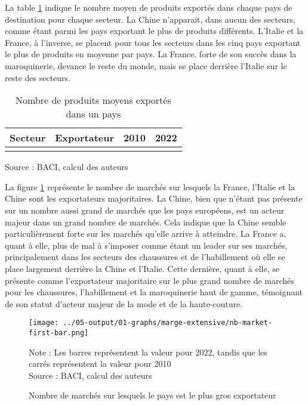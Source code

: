 \documentclass[french,10pt,a4paper]{article}
\begin{document}
La table \ref{tab:table-nb-mean-product-export} indique le nombre moyen de produits exportés dans chaque pays de destination pour chaque secteur. La Chine n'apparait, dans aucun des secteurs, comme étant parmi les pays exportant le plus de produits différents. L'Italie et la France, à l'inverse, se placent pour tous les secteurs dans les cinq pays exportant le plus de produits en moyenne par pays. La France, forte de son succès dans la maroquinerie, devance le reste du monde, mais se place derrière l'Italie sur le reste des secteurs.

\begin{table}[ht]
  \centering
  \begin{tabular}{lrrr}
    \hline
   Secteur & Exportateur & 2010 & 2022 \\
    \hline
    \\
    \hline
  \end{tabular}
  \captionsetup{justification=raggedright,singlelinecheck=false, font=small}
  \caption*{Source : BACI, calcul des auteurs}
  \captionsetup{justification=centering, singlelinecheck=true, font=normalsize}
  \caption{Nombre de produits moyens exportés dans un pays}
  \label{tab:table-nb-mean-product-export}
\end{table}

La figure \ref{fig:nb-market-first-bar} représente le nombre de marchés sur lesquels la France, l'Italie et la Chine sont les exportateurs majoritaires. La Chine, bien que n'étant pas présente sur un nombre aussi grand de marchés que les pays européens, est un acteur majeur dans un grand nombre de marchés. Cela indique que la Chine semble particulièrement forte sur les marchés qu'elle arrive à atteindre. La France a, quant à elle, plus de mal à s'imposer comme étant un leader sur ses marchés, principalement dans les secteurs des chaussures et de l'habillement où elle se place largement derrière la Chine et l'Italie. Cette dernière, quant à elle, se présente comme l'exportateur majoritaire sur le plus grand nombre de marchés pour les chaussures, l'habillement et la maroquinerie haut de gamme, témoignant de son statut d'acteur majeur de la mode et de la haute-couture.


\begin{figure}[!h]
  \centering  \texttt{[image: ../05-output/01-graphs/marge-extensive/nb-market-first-bar.png]}
  \captionsetup{justification=justified, singlelinecheck=false, font=small}
  \caption*{Note : Les barres représentent la valeur pour 2022, tandis que les carrés représentent la valeur pour 2010 \\
  Source : BACI, calcul des auteurs}
  \captionsetup{justification=centering, singlelinecheck=true, font=normalsize}
  \caption{Nombre de marchés sur lesquels le pays est le plus gros exportateur}
  \label{fig:nb-market-first-bar}
\end{figure}
\end{document}
